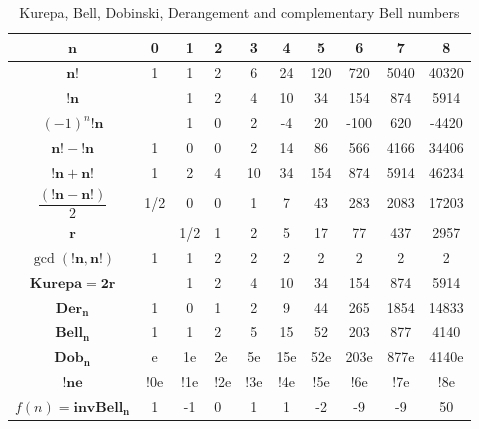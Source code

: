 \documentclass[pdflatex,sn-mathphys-num]{sn-jnl}%
\theoremstyle{thmstyleone}%
\theoremstyle{thmstyletwo}%
\theoremstyle{thmstylethree}%
\begin{document}
\begin{table}[!ht]
    \centering
    \begin{tabular}{|c|c|c|a|c|c|c|c|c|c|}\hline 
        $\mathbf{n}$& 0 & 1 & 2 & 3 &4  &5  & 6 & 7 &8 \\\hline 
         $\mathbf{n!}$& 1 & 1 & 2 & 6 & 24 & 120  & 720 & 5040 & 40320 \\\hline
        $\mathbf{!n}$ &  & 1 & 2 & 4 & 10 & 34 & 154 & 874 &5914 \\\hline
         $(-1)^n\mathbf{!n}$ &  & 1 & 0 & 2 & -4 & 20 & -100 & 620 &-4420 \\\hline
         $\mathbf{n!- !n}$ & 1 & 0 & 0 &  2& 14 & 86 & 566 &4166  &34406 \\\hline
          $\mathbf{!n+ n!}$ & 1 & 2 & 4 &  10& 34 & 154 & 874 & 5914  &46234 \\\hline
        $\dfrac{\mathbf{(!n- n!)}}{2}$ & 1/2 & 0 & 0 & 1 & 7 & 43 & 283 & 2083 & 17203\\\hline {}
        $\mathbf{r}$ &  & 1/2 & 1 & 2 & 5 & 17 &77  &437  &2957 \\\hline  
         $\gcd(\mathbf{!n, n!})$& 1 & 1 & 2 & 2 & 2 &2  & 2 & 2 &2 \\\hline
        $\mathbf{Kurepa=2r}$ &  & 1 & 2 & 4 & 10 & 34 & 154 & 874 & 5914\\\hline
         $\mathbf{Der_n}$ & 1 &0  & 1 & 2 & 9 & 44 & 265 & 1854 &14833 \\\hline
         $\mathbf{Bell_n}$ &1 &1 & 2 & 5 & 15 & 52 & 203 & 877 & 4140 \\\hline
        $\mathbf{Dob_n}$& e  & 1e & 2e & 5e & 15e &52e  &203e  &877e  &4140e \\\hline
        $\mathbf{!ne}$ & !0e & !1e & !2e & !3e & !4e & !5e & !6e & !7e & !8e\\\hline
         $f(n)=\mathbf{invBell_n}$ & 1 & -1 & 0 & 1  & 1 & -2 & -9 & -9 & 50\\\hline
    \end{tabular}
    \caption{\cite{OEIS:A003422, OEIS:A000110, OEIS:A000587, OEIS:A000166}  Kurepa, Bell, Dobinski, Derangement and complementary Bell numbers}
    \label{table 1}
\end{table}
\end{document}
